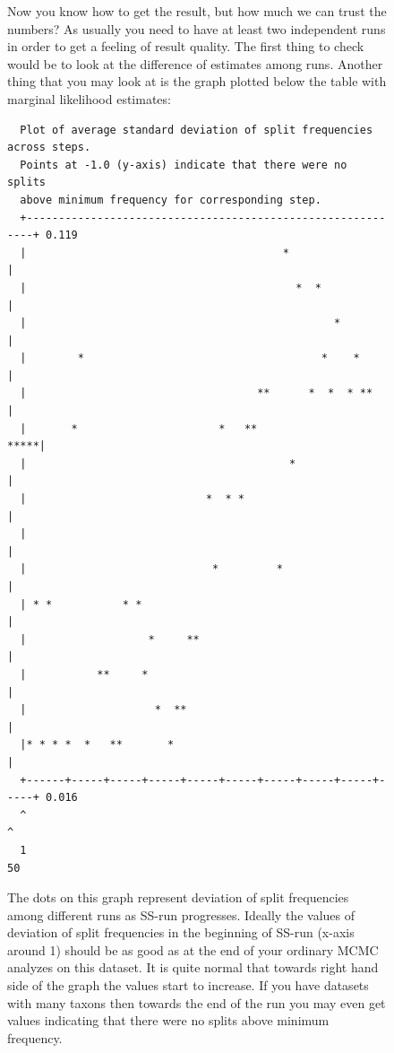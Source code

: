 \documentclass[12pt]{book}
\begin{document}
\begin{figure}[h]
Now you know how to get the result, but how much we can trust the numbers? As usually you need to
have at least two independent runs in order to get a feeling of result quality. The first thing to
check would be to look at the difference of estimates among runs. Another thing that you may look
at is the graph plotted below the table with marginal likelihood estimates:

\begin{singlespacing}
\footnotesize
\begin{verbatim}
  Plot of average standard deviation of split frequencies across steps.
  Points at -1.0 (y-axis) indicate that there were no splits
  above minimum frequency for corresponding step.
  +------------------------------------------------------------+ 0.119
  |                                        *                   |
  |                                          *  *              |
  |                                                *           |
  |        *                                     *    *        |
  |                                    **      *  *  * **      |
  |       *                      *   **                   *****|
  |                                         *                  |
  |                            *  * *                          |
  |                                                            |
  |                             *         *                    |
  | * *           * *                                          |
  |                   *     **                                 |
  |           **     *                                         |
  |                    *  **                                   |
  |* * * *  *   **       *                                     |
  +------+-----+-----+-----+-----+-----+-----+-----+-----+-----+ 0.016
  ^                                                            ^
  1                                                           50
\end{verbatim}
\end{singlespacing}
\normalsize

The dots on this graph represent deviation of split frequencies among different runs as SS-run
progresses. Ideally the values of deviation of split frequencies in the beginning of SS-run (x-axis
around 1) should be as good as at the end of your ordinary MCMC analyzes on this dataset. It is
quite normal that towards right hand side of the graph the values start to increase. If you have
datasets with many taxons then towards the end of the run you may even get values indicating that
there were no splits above minimum frequency.


\end{figure}
\end{document}
